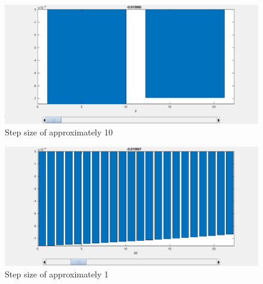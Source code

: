 \begin{figure}[]
    \centering
    \includegraphics[scale=0.60, center]{eps/stepsOf10.eps}
    \caption{Step size of approximately 10}
    \label{fig:Riemann10}
\end{figure}
\begin{figure}[]
    \centering
    \includegraphics[scale=0.60, center]{eps/stepsOf1.eps}
    \caption{Step size of approximately 1}
    \label{fig:Riemann1}
\end{figure}
